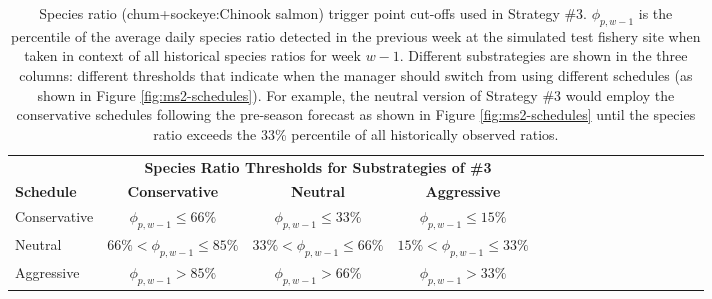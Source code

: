 \documentclass[12pt,]{book}
\theoremstyle{definition}
\theoremstyle{definition}
\theoremstyle{definition}
\theoremstyle{remark}
\begin{document}
\begin{singlespace}

\begin{table}

\caption{\label{tab:ms3-ratio-table}Species ratio (chum+sockeye:Chinook salmon) trigger point cut-offs used in Strategy \#3. $\phi_{p, w-1}$ is the percentile of the average daily species ratio detected in the previous week at the simulated test fishery site when taken in context of all historical species ratios for week $w-1$. Different substrategies are shown in the three columns: different thresholds that indicate when the manager should switch from using different schedules (as shown in Figure \ref{fig:ms2-schedules}). For example, the neutral version of Strategy \#3 would employ the conservative schedules following the pre-season forecast as shown in Figure \ref{fig:ms2-schedules} until the species ratio exceeds the 33\% percentile of all historically observed ratios.}
\centering
\begin{tabular}[t]{lccclccclccclccc}
\toprule
\multicolumn{1}{c}{\bfseries } & \multicolumn{3}{c}{\bfseries Species Ratio Thresholds for Substrategies of \#3} \\
\cmidrule(l{2pt}r{2pt}){2-4}
\textbf{Schedule} & \textbf{Conservative} & \textbf{Neutral} & \textbf{Aggressive}\\
\midrule
Conservative & $\phi_{p, w-1} \le 66\%$ & $\phi_{p, w-1} \le 33\%$ & $\phi_{p, w-1} \le 15\%$\\
Neutral & $66 \% < \phi_{p, w-1} \le 85\%$ & $33 \% < \phi_{p, w-1} \le 66\%$ & $15 \% < \phi_{p, w-1} \le 33\%$\\
Aggressive & $\phi_{p, w-1} > 85\%$ & $\phi_{p, w-1} > 66\%$ & $\phi_{p, w-1} > 33\%$\\
\bottomrule
\end{tabular}
\end{table}

\clearpage

\begin{table}


\end{table}
\end{singlespace}
\end{document}
